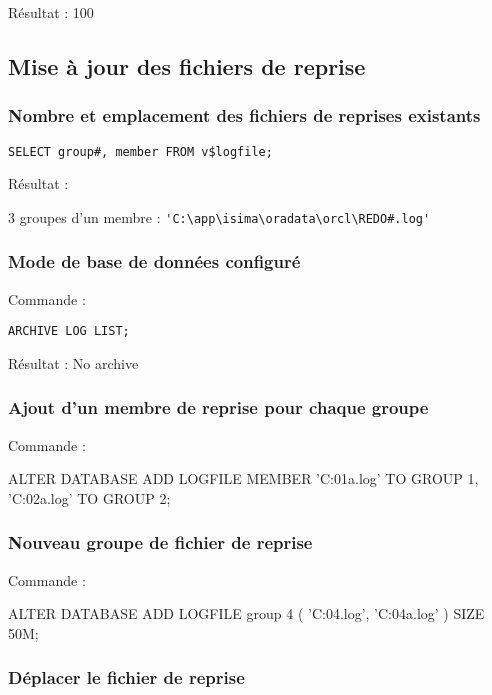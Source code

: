Résultat : 100

\subsection{Mise à jour des fichiers de reprise}
\subsubsection{Nombre et emplacement des fichiers de reprises existants}

\begin{verbatim}
SELECT group#, member FROM v$logfile;
\end{verbatim}

Résultat : 

3 groupes d'un membre :  \verb|'C:\app\isima\oradata\orcl\REDO#.log'|

\subsubsection{Mode de base de données configuré}

Commande :
\begin{verbatim}
ARCHIVE LOG LIST;
\end{verbatim}

Résultat : No archive

\subsubsection{Ajout d'un membre de reprise pour chaque groupe}

Commande : 
\begin{verbatimtab}
ALTER DATABASE ADD LOGFILE MEMBER
	'C:\app\isima\oradata\orcl\REDO01a.log' TO GROUP 1,
	'C:\app\isima\oradata\orcl\REDO02a.log' TO GROUP 2;
\end{verbatimtab}

\subsubsection{Nouveau groupe de fichier de reprise}

Commande : 
\begin{verbatimtab}
ALTER DATABASE ADD LOGFILE group 4 (
	'C:\app\isima\oradata\orcl\REDO04.log',
	'C:\app\isima\oradata\orcl\REDO04a.log'
) SIZE 50M;
\end{verbatimtab}

\subsubsection{Déplacer le fichier de reprise}

